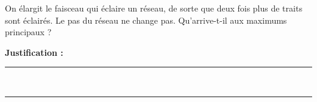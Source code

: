 On élargit le faisceau qui éclaire un réseau, de sorte que deux fois plus de traits sont éclairés. Le pas du réseau ne change pas. Qu'arrive-t-il aux maximums principaux ?

\choices

\noindent\textbf{Justification :} \hrulefill \\[2.5ex]
\rule{\linewidth}{0.4pt} \\[2.5ex]
\rule{\linewidth}{0.4pt}
\vfill
